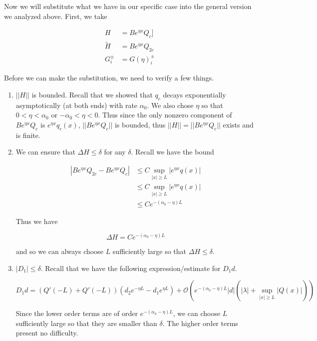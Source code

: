 \documentclass[12pt]{article}
\begin{document}
Now we will substitute what we have in our specific case into the general version we analyzed above. First, we take

\begin{align*}
H &= B e^{\eta x}Q_c ] \\
\tilde{H} &= B e^{\eta x}Q_{2c}  \\
G_i^\pm &= G(\eta)_i^\pm
\end{align*}

Before we can make the substitution, we need to verify a few things.

\begin{enumerate}

\item $||H||$ is bounded. Recall that we showed that $q_c$ decays exponentially asymptotically (at both ends) with rate $\alpha_0$. We also chose $\eta$ so that $0 < \eta < \alpha_0$ or $-\alpha_0 < \eta < 0$. Thus since the only nonzero component of $B e^{\eta x}Q_c $ is $e^{\eta x} q_c(x)$, $||B e^{\eta x}Q_c ||$ is bounded, thus $||H|| = ||B e^{\eta x}Q_c ||$ exists and is finite.\\

\item We can ensure that $\Delta H \leq \delta$ for any $\delta$. Recall we have the bound

\begin{align*}
| B e^{\eta x}Q_{2c}  - B e^{\eta x}Q_c  | &\leq C \sup_{|x| \geq L} |e^{\eta x} q(x)| \\
&\leq C \sup_{|x| \geq L} |e^{\eta x} q(x)| \\
&\leq C e^{-(\alpha_0 - \eta)L}
\end{align*}

Thus we have

\[
\Delta H = C e^{-(\alpha_0 - \eta)L}
\]

and so we can always choose $L$ sufficiently large so that $\Delta H \leq \delta$.

\item $|D_1| \leq \delta$. Recall that we have the following expression/estimate for $D_1 d$. 

\[
D_1 d = ( Q'(-L) + Q'(-L) )(d_2 e^{-\eta L} - d_1 e^{\eta L}) + \mathcal{O} \left( e^{-(\alpha_0 - \eta) L}|d| \left( |\lambda| +  \sup_{|x| \geq L} |Q(x)| \right) \right)
\]

Since the lower order terms are of order $e^{-(\alpha_0 - \eta)L}$, we can choose $L$ sufficiently large so that they are smaller than $\delta$. The higher order terms present no difficulty.

\end{enumerate}
\end{document}
